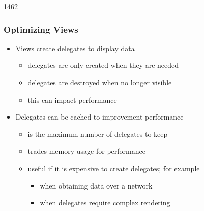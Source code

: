 \begin{slide}{1462}\frametitle{Optimizing Views}

\begin{itemize}
\item Views create delegates to display data
  \begin{itemize}
  \item delegates are only created when they are needed
  \item delegates are destroyed when no longer visible
  \item this can impact performance
  \end{itemize}
\item Delegates can be cached to improvement performance
  \begin{itemize}
  \item {} is the maximum number of delegates to keep
  \item trades memory usage for performance
  \item useful if it is expensive to create delegates; for example
    \begin{itemize}
    \item when obtaining data over a network
    \item when delegates require complex rendering
    \end{itemize}
  \end{itemize}
\end{itemize}

\end{slide}
